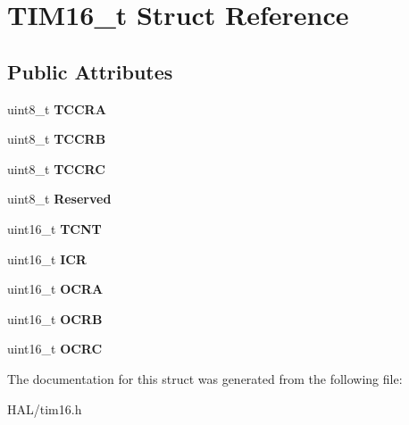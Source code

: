 \hypertarget{struct_t_i_m16__t}{}\section{T\+I\+M16\+\_\+t Struct Reference}
\label{struct_t_i_m16__t}
\subsection*{Public Attributes}
\begin{DoxyCompactItemize}
\item 
\mbox{\label{struct_t_i_m16__t_a5b1d1b7928cd183edd10516eed70627e}} 
uint8\+\_\+t {\bfseries T\+C\+C\+RA}
\item 
\mbox{\label{struct_t_i_m16__t_a72e8cb5abf6b3d8f23a6c1377b09f895}} 
uint8\+\_\+t {\bfseries T\+C\+C\+RB}
\item 
\mbox{\label{struct_t_i_m16__t_acc2ab9a96ff0fcf705c4abcff09c774e}} 
uint8\+\_\+t {\bfseries T\+C\+C\+RC}
\item 
\mbox{\label{struct_t_i_m16__t_a6619f2a2945867747f3b1689feb1e2a6}} 
uint8\+\_\+t {\bfseries Reserved}
\item 
\mbox{\label{struct_t_i_m16__t_a4416ad179ea7399ec1991860a8af87a5}} 
uint16\+\_\+t {\bfseries T\+C\+NT}
\item 
\mbox{\label{struct_t_i_m16__t_ad00dda3e60772bc7149955db0027cdea}} 
uint16\+\_\+t {\bfseries I\+CR}
\item 
\mbox{\label{struct_t_i_m16__t_a2c9d7ddebde555c869515a10d45abdac}} 
uint16\+\_\+t {\bfseries O\+C\+RA}
\item 
\mbox{\label{struct_t_i_m16__t_affd8a05348bd3bad4c8553183c8cf632}} 
uint16\+\_\+t {\bfseries O\+C\+RB}
\item 
\mbox{\label{struct_t_i_m16__t_aadc785ac649de5b961270fca40608727}} 
uint16\+\_\+t {\bfseries O\+C\+RC}
\end{DoxyCompactItemize}


The documentation for this struct was generated from the following file\+:\begin{DoxyCompactItemize}
\item 
H\+A\+L/tim16.\+h\end{DoxyCompactItemize}
